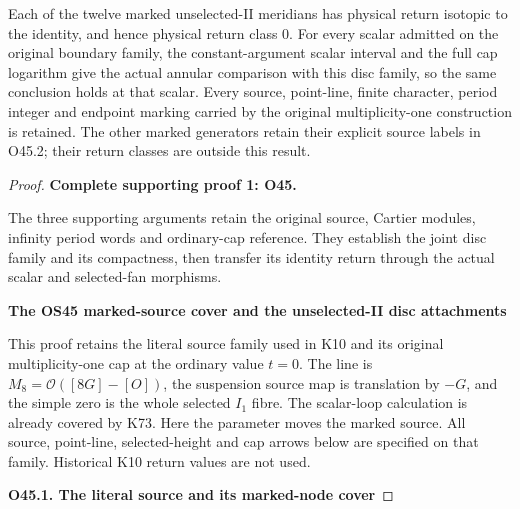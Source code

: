\begin{theorem}
Each of the twelve marked unselected-II meridians has physical return
isotopic to the identity, and hence physical return class \(0\).
For every scalar admitted on the original boundary family, the
constant-argument scalar interval and the full cap logarithm give the
actual annular comparison with this disc family, so the same conclusion
holds at that scalar. Every source, point-line, finite character,
period integer and endpoint marking carried by the original
multiplicity-one construction is retained. The other marked generators
retain their explicit source labels in O45.2; their return classes are
outside this result.
\end{theorem}
\begin{proof}

\par\bigskip\noindent\textbf{Complete supporting proof 1: O45.}\par


The three supporting arguments retain the original source,
Cartier modules, infinity period words and ordinary-cap reference.
They establish the joint disc family and its compactness,
then transfer its identity return through the actual scalar
and selected-fan morphisms.

\par

\medskip\noindent\textbf{The OS45 marked-source cover and the unselected-II disc attachments}

\par\nobreak

This proof retains the literal source family used in K10 and its
original multiplicity-one cap at the ordinary value \(t=0\). The line
is \(M_8=\mathcal O([8G]-[O])\), the suspension source map is
translation by \(-G\), and the simple zero is the whole selected
\(I_1\) fibre. The scalar-loop calculation is already covered by
K73. Here the parameter moves the marked source. All source,
point-line, selected-height and cap arrows below are specified on
that family. Historical K10 return values are not used.

\par

\medskip\noindent\textbf{O45.1. The literal source and its marked-node cover}

\par\nobreak


\end{proof}
